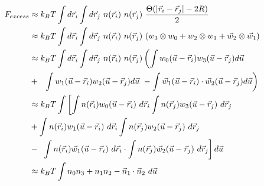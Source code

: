 \documentclass[double,12pt]{beavtex}
\begin{document}
\begin{align}      
     F_{excess} &\approx k_BT\int d\vec r_i \int d\vec r_j~n(\vec r_i)~n(\vec r_j)~\frac{\Theta(|\vec r_i-\vec r_j|-2R)}{2}         \\ 
                &\approx k_BT\int d\vec r_i \int d\vec r_j~n(\vec r_i)~n(\vec r_j)~(w_3\otimes w_0+ w_2 \otimes w_1+\vec {w}_2\otimes \vec {w}_1)  \\
                &\approx k_BT\int d\vec r_i \int d\vec r_j~n(\vec r_i)~n(\vec r_j)\left(\int w_0(\vec u - \vec r_i)w_3(\vec u - \vec r_j) d\vec u \color{white}\right)  \nonumber    \\
                &+ \color{white}\left(\color{black}\int w_1(\vec u - \vec r_i)w_2(\vec u - \vec r_j) d\vec u ~-\int \vec {w}_1(\vec u - \vec r_i)\cdot\vec {w}_2(\vec u - \vec r_j) d\vec u\right) \\                                                    
                &\approx k_BT\int \left[\int n(\vec r_i) w_0(\vec u - \vec r_i)~d\vec r_i \int n(\vec r_j) w_3(\vec u - \vec r_j)~d\vec r_j \color{white}\right]  \nonumber \\
                &+ \int n(\vec r_i) w_1(\vec u - \vec r_i)~d\vec r_i \int n(\vec r_j) w_2(\vec u - \vec r_j)~d\vec r_j  \nonumber \\
                &- \color{white}\left[\color{black} \int n(\vec r_i) \vec {w}_1(\vec u - \vec r_i)~d\vec r_i \cdot \int n(\vec r_j) \vec {w}_2(\vec u - \vec r_j)~d\vec r_j \right]\color{black}d\vec u  \\              
                &\approx k_BT\int n_0n_3 + n_1n_2 - \vec n_1\cdot\vec n_2~d\vec u  \label{Fexlowden-inhomo}                  
\end{align}
\end{document}
